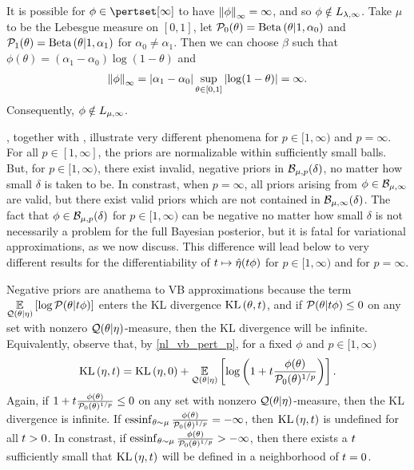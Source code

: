 \begin{ex}
%
It is possible for $\phi \in \pertset[\infty]$ to have $\left\Vert\phi\right\Vert_{\infty} =
\infty$, and so $\phi \notin {L_{\lambda,\infty}}$.  Take $\mu$ to be the
Lebesgue measure on $[0,1]$, let $\mathcal{P}_{0}(\theta) = \mathrm{Beta}\left(\theta \vert 1,
\alpha_0\right)$ and $\mathcal{P}_{1}(\theta) = \mathrm{Beta}\left(\theta \vert 1, \alpha_1\right)$ for
$\alpha_0 \ne \alpha_1$.  Then we can choose $\beta$ such that $\phi(\theta) =
(\alpha_1 - \alpha_0) \log(1 - \theta)$
%
and
%
\begin{align*}
%
\norminf{\phi} =
    \abs{\alpha_1 - \alpha_0} \sup_{\theta \in [0,1]} \abs{\log(1 - \theta)} =
    \infty.
%
\end{align*}
%
Consequently, $\phi \notin {L_{\mu,\infty}}$.
%
\end{ex}


, together with ,
illustrate very different phenomena for $p \in [1, \infty)$ and $p = \infty$.
For all $p \in [1, \infty]$, the priors are normalizable within sufficiently
small balls.  But, for $p \in [1, \infty)$, there exist invalid, negative priors
in $\mathcal{B}_{\mu,p}(\delta)$, no matter how small $\delta$ is taken to be.  In
constrast, when $p = \infty$, all priors arising from $\phi \in
\mathcal{B}_{\mu,\infty}$ are valid, but there exist valid priors which are not
contained in $\mathcal{B}_{\mu,\infty}(\delta)$.  The fact that $\phi \in
\mathcal{B}_{\mu,p}(\delta)$ for $p \in [1, \infty)$ can be negative no matter how
small $\delta$ is not necessarily a problem for the full Bayesian posterior, but
it is fatal for variational approximations, as we now discuss.  This difference
will lead below to very different results for the differentiability of $t
\mapsto \hat\eta(t \phi)$ for $p \in [1, \infty)$ and for $p = \infty$.

Negative priors are anathema to VB approximations because the term
$\underset{\mathcal{Q}(\theta \vert \eta)}{\mathbb{E}}\left[\log \mathcal{P}(\theta \vert t \phi)\right]$ enters the KL
divergence $\mathrm{KL}\left(\theta, t\right)$, and if $\mathcal{P}(\theta \vert t \phi) \le 0$ on any set
with nonzero $\mathcal{Q}(\theta \vert \eta)$-measure, then the KL divergence will be
infinite.  Equivalently, observe that, by
\eqref{nl_vb_pert_p}, for a fixed $\phi$ and $p \in [1, \infty)$
%
\begin{align*}
%
\KL{\eta, \t} = \KL{\eta, 0} +
\expect{\q(\theta \vert \eta)}
       {\log\left(1 + \t \frac{\phi(\theta)}{\pbase(\theta)^{1/p}}\right)}.
%
\end{align*}
%
Again, if $1 + t \frac{\phi(\theta)}{\mathcal{P}_{0}(\theta)^{1/p}} \le 0$ on any set
with nonzero $\mathcal{Q}(\theta \vert \eta)$-measure, then the KL divergence is
infinite.  If $\operatorname*{\mathrm{essinf}}_{\theta \sim
\mu}\frac{\phi(\theta)}{\mathcal{P}_{0}(\theta)^{1/p}} = -\infty$, then $\mathrm{KL}\left(\eta, t\right)$
is undefined for all $t > 0$.  In constrast, if $\operatorname*{\mathrm{essinf}}_{\theta \sim
\mu}\frac{\phi(\theta)}{\mathcal{P}_{0}(\theta)^{1/p}} > -\infty$, then there exists a
$t$ sufficiently small that $\mathrm{KL}\left(\eta, t\right)$ will be defined in a neighborhood
of $t = 0$.

